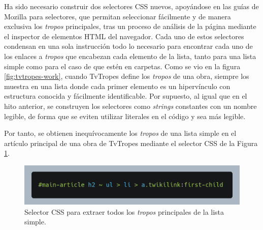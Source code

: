 Ha sido necesario construir dos selectores CSS nuevos, apoyándose en las guías
de Mozilla para selectores, que permitan seleccionar fácilmente y de manera
exclusiva los \textit{tropos} principales, tras un proceso de análisis de la
página mediante el inspector de elementos HTML del navegador. Cada uno de estos
selectores condensan en una sola instrucción todo lo necesario para encontrar
cada uno de los enlaces a \textit{tropos} que encabezan cada elemento de la
lista, tanto para una lista simple como para el caso de que estén en carpetas.
Como se vio en la figura \ref{fig:tvtropes-work}, cuando TvTropes define los
\textit{tropos} de una obra, siempre los muestra en una lista donde cada primer
elemento es un hipervínculo con estructura conocida y fácilmente identificable.
Por supuesto, al igual que en el hito anterior, se construyen los selectores
como \textit{strings} constantes con un nombre legible, de forma que se eviten
utilizar literales en el código y sea más legible.

Por tanto, se obtienen inequívocamente los \textit{tropos} de una lista simple
en el artículo principal de una obra de TvTropes mediante el selector CSS de la
Figura \ref{fig:selector-lista}.

\begin{figure}[ht]
    \includegraphics[width=\textwidth]{img/selector-tropes.png}
    \caption{Selector CSS para extraer todos los \textit{tropos} principales de
    la lista simple.}
    \label{fig:selector-lista}
\end{figure}


